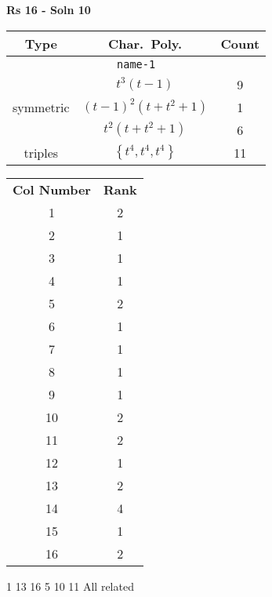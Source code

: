 \documentclass{article}
\begin{document}
    \textbf{Rs 16 - Soln 10}
    \begin{table}
    \begin{tabular}{|c|c|c|}
    \hline
    \textbf{Type} & \textbf{Char.~Poly.} & \textbf{Count} \\
    \hline \multicolumn{3}{|c|}{\texttt{name-1}} \\ \hline
    \multirow{3}{*}{symmetric}
    & $t^3(t - 1)$ & 9 \\
    & $(t - 1)^2(t + t^2 + 1)$ & 1 \\
    & $t^2(t + t^2 + 1)$ & 6 \\
    \hline
    \multirow{1}{*}{triples}
    & $\left\{t^4,t^4,t^4\right\}$ & 11 \\
    \hline
    \end{tabular}
    \end{table}
    \begin{table}
    \begin{tabular}{|c|c|}
    \hline
    \textbf{Col Number} & \textbf{Rank}\\
    1 & 2 \\ 
    2 & 1 \\ 
    3 & 1 \\ 
    4 & 1 \\ 
    5 & 2 \\ 
    6 & 1 \\ 
    7 & 1 \\ 
    8 & 1 \\ 
    9 & 1 \\ 
    10 & 2 \\ 
    11 & 2 \\ 
    12 & 1 \\ 
    13 & 2 \\ 
    14 & 4 \\ 
    15 & 1 \\ 
    16 & 2 \\ 
    \hline
    \end{tabular}
    \end{table}

    1 13 16
    5 10 11
    All related
    \newpage
\end{document}
